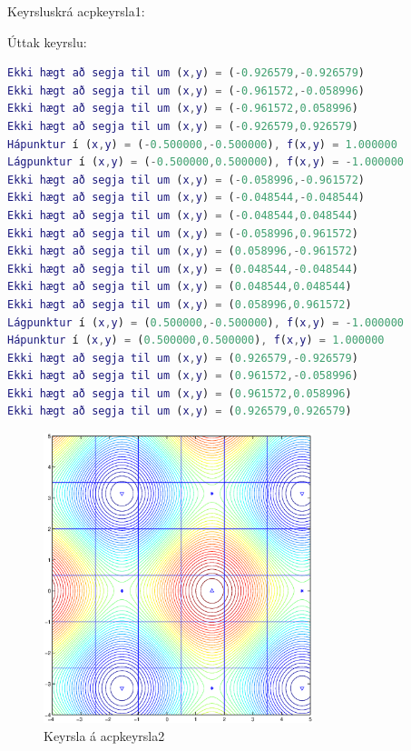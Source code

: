 \documentclass[a4]{article}
\begin{document}
Keyrsluskrá acpkeyrsla1:


\newpage

Úttak keyrslu:
\begin{lstlisting}[language=Matlab]
Ekki hægt að segja til um (x,y) = (-0.926579,-0.926579)
Ekki hægt að segja til um (x,y) = (-0.961572,-0.058996)
Ekki hægt að segja til um (x,y) = (-0.961572,0.058996)
Ekki hægt að segja til um (x,y) = (-0.926579,0.926579)
Hápunktur í (x,y) = (-0.500000,-0.500000), f(x,y) = 1.000000
Lágpunktur í (x,y) = (-0.500000,0.500000), f(x,y) = -1.000000
Ekki hægt að segja til um (x,y) = (-0.058996,-0.961572)
Ekki hægt að segja til um (x,y) = (-0.048544,-0.048544)
Ekki hægt að segja til um (x,y) = (-0.048544,0.048544)
Ekki hægt að segja til um (x,y) = (-0.058996,0.961572)
Ekki hægt að segja til um (x,y) = (0.058996,-0.961572)
Ekki hægt að segja til um (x,y) = (0.048544,-0.048544)
Ekki hægt að segja til um (x,y) = (0.048544,0.048544)
Ekki hægt að segja til um (x,y) = (0.058996,0.961572)
Lágpunktur í (x,y) = (0.500000,-0.500000), f(x,y) = -1.000000
Hápunktur í (x,y) = (0.500000,0.500000), f(x,y) = 1.000000
Ekki hægt að segja til um (x,y) = (0.926579,-0.926579)
Ekki hægt að segja til um (x,y) = (0.961572,-0.058996)
Ekki hægt að segja til um (x,y) = (0.961572,0.058996)
Ekki hægt að segja til um (x,y) = (0.926579,0.926579)
\end{lstlisting}


\begin{figure}[h!]
\centering
\includegraphics[width=0.7\textwidth]{acpkeyrsla2.eps}
\caption{Keyrsla á acpkeyrsla2}
\end{figure}
\end{document}
